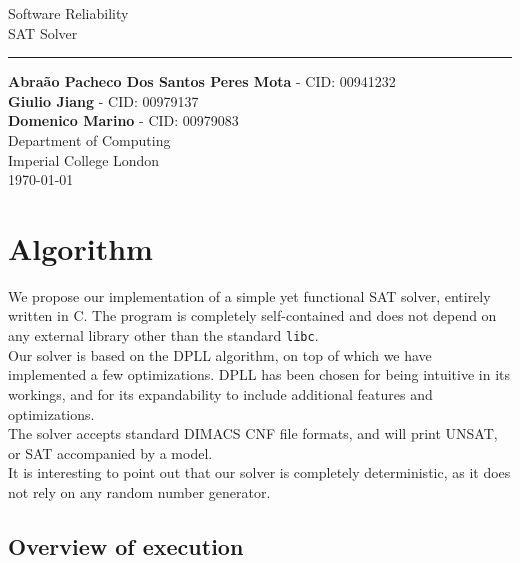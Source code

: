 \documentclass[a4paper]{article}
\begin{document}
\begin{titlepage}
    \begin{center}
        \vspace*{1cm}
        \vspace*{1cm}          
        \vspace{0.5cm}
        \LARGE
        Software Reliability\\ SAT Solver\\
                \noindent\rule{8cm}{0.4pt}
        \vspace{1.5cm}
 
        \large
        \textbf{Abra\~{a}o Pacheco Dos Santos Peres Mota} - CID: 00941232 \\
        \textbf{Giulio Jiang} - CID: 00979137 \\
        \textbf{Domenico Marino} - CID: 00979083 \\

        \vfill
        \vspace{0.8cm}
        \Large
        Department of Computing\\
        Imperial College London\\
        \today
        
    \end{center}
\end{titlepage}


\newpage

\section{Algorithm}

We propose our implementation of a simple yet functional SAT solver, entirely written in C. The program is completely self-contained and does not depend on any external library other than the standard \texttt{libc}.\\
Our solver is based on the DPLL algorithm, on top of which we have implemented a few optimizations. DPLL has been chosen for being intuitive in its workings, and for its expandability to include additional features and optimizations.\\
The solver accepts standard DIMACS CNF file formats, and will print UNSAT, or SAT accompanied by a model.\\
It is interesting to point out that our solver is completely deterministic, as it does not rely on any random number generator.\\

\subsection{Overview of execution}
\end{document}
